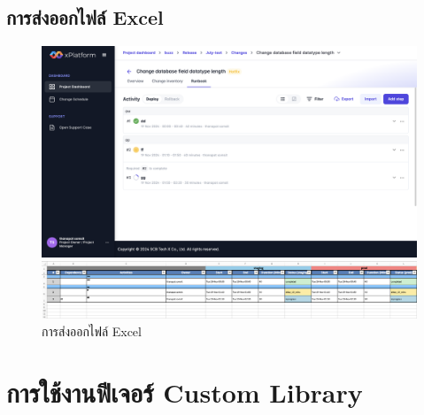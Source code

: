 \subsection{การส่งออกไฟล์ Excel}
\begin{figure}[H]
    \begin{center}
        \includegraphics[width=\linewidth]{resources/pages/change-runbook/export-activity/20.png}
    
        \vspace{1in}
    
        \includegraphics[width=\linewidth]{resources/pages/change-runbook/export-activity/21.png}
    \end{center}
    \caption[การส่งออกไฟล์ Excel]{การส่งออกไฟล์ Excel}
  \label{fig:excel-export}
\end{figure}

\newpage
\section{การใช้งานฟีเจอร์ Custom Library}
